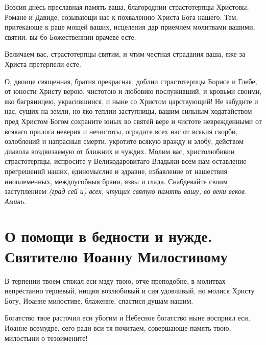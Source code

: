 

Возсия днесь преславная память ваша, благороднии страстотерпцы Христовы, Романе и Давиде, созывающи нас к похвалению Христа Бога нашего. Тем, притекающе к раце мощей ваших, исцеления дар приемлем молитвами вашими, святии: вы бо Божественнии врачеве есте.




Величаем вас, страстотерпцы святии, и чтим честная страдания ваша, яже за Христа претерпели есте.




О, двоице священная, братия прекрасная, доблии страстотерпцы Борисе и Глебе, от юности Христу верою, чистотою и любовию послуживший, и кровьми своими, яко багряницею, украсившиися, и ныне со Христом царствующий! Не забудите и нас, сущих на земли, но яко теплии заступницы, вашим сильным ходатайством пред Христом Богом сохраните юных во святей вере и чистоте неврежденными от всякаго прилога неверия и нечистоты, оградите всех нас от всякия скорби, озлоблений и напрасныя смерти, укротите всякую вражду и злобу, действом диавола воздвизаемую от ближних и чуждих. Молим вас, христолюбивии страстотерпцы, испросите у Великодаровитаго Владыки всем нам оставление прегрешений наших, единомыслие и здравие, избавление от нашествия иноплеменных, междоусобныя брани, язвы и глада. Снабдевайте своим заступлением \itshape (град сей и)\normalfont{} всех, чтущих святую память вашу, во веки веков. Аминь.
\mychapterending


 

\section{О помощи в бедности и нужде. Святителю Иоанну Милостивому}
 




В терпении твоем стяжал еси мзду твою, отче преподобне, в молитвах непрестанно терпевый, нищия возлюбивый и сия удовливый, но молися Христу Богу, Иоанне милостиве, блаженне, спастися душам нашим.




Богатство твое расточил еси убогим и Небесное богатство ныне восприял еси, Иоанне всемудре, сего ради вси тя почитаем, совершающе память твою, милостыни о тезоимените!


